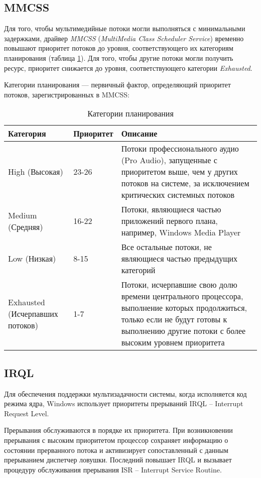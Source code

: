 \subsection{MMCSS}
Для того, чтобы мультимедийные потоки могли выполняться с минимальными задержками, драйвер \textit{MMCSS} (\textit{MultiMedia Class Scheduler Service}) временно повышают приоритет потоков до уровня, соответствующего их категориям планирования (таблица \ref{tab:category}).
Для того, чтобы другие потоки могли получить ресурс, приоритет снижается до уровня, соответствующего категории \textit{Exhausted}.

Категории планирования --- первичный фактор, определяющий приоритет потоков, зарегистрированных в MMCSS:
\begin{table}[!h]
	\caption{Категории планирования}
	\begin{center}
		\begin{tabular}{|p{40mm}|p{30mm}|p{80mm}|}
			\hline
			\textbf{Категория} & \textbf{Приоритет} & \textbf{Описание} \\
			\hline
			High (Высокая) & 23-26 & Потоки профессионального аудио (Pro
			Audio), запущенные с приоритетом выше, чем у других потоков на системе, за
			исключением критических системных потоков \\
			\hline
			Medium (Средняя) & 16-22 & Потоки, являющиеся частью приложений
			первого плана, например, Windows Media Player \\
			\hline
			Low (Низкая) & 8-15 & Все остальные потоки, не являющиеся частью
			предыдущих категорий \\
			\hline
			Exhausted (Исчерпавших потоков) & 1-7 & Потоки, исчерпавшие свою
			долю времени центрального процессора, выполнение которых продолжиться, только
			если не будут готовы к выполнению другие потоки с более высоким уровнем
			приоритета \\
			\hline
		\end{tabular}
	\end{center}
	\label{tab:category}
\end{table}

\subsection{IRQL}

Для обеспечения поддержки мультизадачности системы, когда исполняется код режима ядра, Windows использует приоритеты прерываний IRQL --  Interrupt Request Level.

Прерывания обслуживаются в порядке их приоритета.
При возникновении прерывания с высоким приоритетом процессор сохраняет информацию о состоянии прерванного потока и активизирует сопоставленный с данным прерыванием диспетчер ловушки.
Последний повышает IRQL и вызывает
процедуру обслуживания прерывания ISR -- Interrupt Service Routine.

